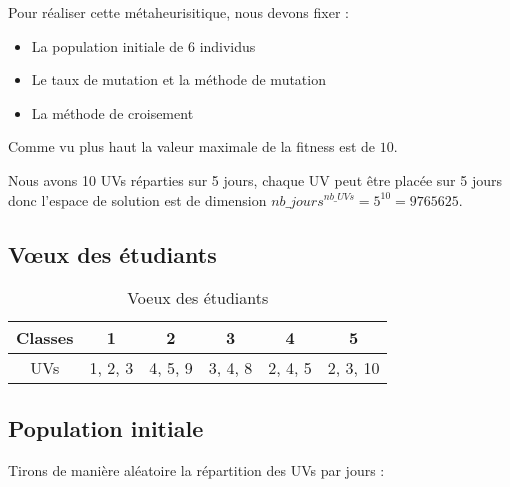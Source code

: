 
Pour réaliser cette métaheurisitique, nous devons fixer :
\begin{itemize}
    \item La population initiale de 6 individus
    \item Le taux de mutation et la méthode de mutation
    \item La méthode de croisement
\end{itemize}

Comme vu plus haut la valeur maximale de la fitness est de $10$.

Nous avons 10 UVs réparties sur 5 jours, chaque UV peut être placée sur 5 jours donc l'espace de solution est de dimension $nb\_jours^{nb\_UVs} = 5^{10} = 9765625$.

\subsection{V\oe ux des étudiants}\label{subsec:voeux-des-etudiants}


\begin{table}[!h]
    \centering
    \begin{tabular}{|c|c|c|c|c|c|}
        \hline
        Classes & 1       & 2       & 3       & 4       & 5        \\
        \hline
        UVs     & 1, 2, 3 & 4, 5, 9 & 3, 4, 8 & 2, 4, 5 & 2, 3, 10 \\
        \hline
    \end{tabular}
    \caption{Voeux des étudiants}\label{tab:voeux-etudiant}
\end{table}

\subsection{Population initiale}\label{subsec:population-initiale}

Tirons de manière aléatoire la répartition des UVs par jours :


